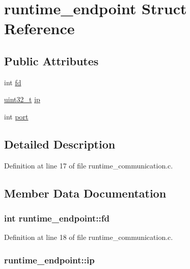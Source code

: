 \hypertarget{structruntime__endpoint}{\section{runtime\-\_\-endpoint Struct Reference}
\label{structruntime__endpoint}
}
\subsection*{Public Attributes}
\begin{DoxyCompactItemize}
\item 
int \hyperlink{structruntime__endpoint_a24f38117a184460e87612dc22b9c5669}{fd}
\item 
\hyperlink{msus_2webserver_2uthash_8h_a435d1572bf3f880d55459d9805097f62}{uint32\-\_\-t} \hyperlink{structruntime__endpoint_a1df7434bdf4e9d66371e54f81e1ceb0d}{ip}
\item 
int \hyperlink{structruntime__endpoint_a9b80d9b279d096c6f7c6628e60665c00}{port}
\end{DoxyCompactItemize}


\subsection{Detailed Description}


Definition at line 17 of file runtime\-\_\-communication.\-c.



\subsection{Member Data Documentation}
\hypertarget{structruntime__endpoint_a24f38117a184460e87612dc22b9c5669}{
\subsubsection[{fd}]{\setlength{\rightskip}{0pt plus 5cm}int runtime\-\_\-endpoint\-::fd}}\label{structruntime__endpoint_a24f38117a184460e87612dc22b9c5669}


Definition at line 18 of file runtime\-\_\-communication.\-c.

\hypertarget{structruntime__endpoint_a1df7434bdf4e9d66371e54f81e1ceb0d}{
\subsubsection[{ip}]{ runtime\-\_\-endpoint\-::ip}}\label{structruntime__endpoint_a1df7434bdf4e9d66371e54f81e1ceb0d}


